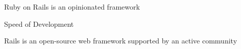 Ruby on Rails is an opinionated framework

Speed of Development

Rails is an open-source web framework supported by an active community